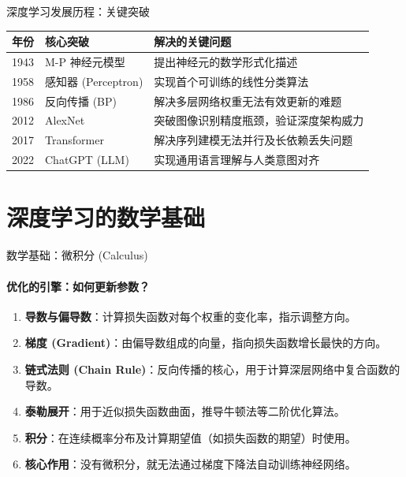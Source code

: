 \documentclass[12pt, t, aspectratio=169]{beamer}
\begin{document}
\begin{frame}{深度学习发展历程：关键突破}
    \centering
    \renewcommand{\arraystretch}{1.5} %
    \begin{tabular}{|c|l|l|}
        \hline
        \textbf{年份} & \textbf{核心突破} & \textbf{解决的关键问题} \\
        \hline
        1943 & M-P 神经元模型 & 提出神经元的数学形式化描述 \\
        \hline
        1958 & 感知器 (Perceptron) & 实现首个可训练的线性分类算法 \\
        \hline
        1986 & 反向传播 (BP) & 解决多层网络权重无法有效更新的难题 \\
        \hline
        2012 & AlexNet & 突破图像识别精度瓶颈，验证深度架构威力 \\
        \hline
        2017 & Transformer & 解决序列建模无法并行及长依赖丢失问题 \\
        \hline
        2022 & ChatGPT (LLM) & 实现通用语言理解与人类意图对齐 \\
        \hline
    \end{tabular}
\end{frame}

\section{深度学习的数学基础}

\begin{frame}{数学基础：微积分 (Calculus)}
    \framesubtitle{优化的引擎：如何更新参数？}
    \begin{enumerate}
        \item \textbf{导数与偏导数}：计算损失函数对每个权重的变化率，指示调整方向。
        \item \textbf{梯度 (Gradient)}：由偏导数组成的向量，指向损失函数增长最快的方向。
        \item \textbf{链式法则 (Chain Rule)}：反向传播的核心，用于计算深层网络中复合函数的导数。
        \item \textbf{泰勒展开}：用于近似损失函数曲面，推导牛顿法等二阶优化算法。
        \item \textbf{积分}：在连续概率分布及计算期望值（如损失函数的期望）时使用。
        \item \textbf{核心作用}：没有微积分，就无法通过梯度下降法自动训练神经网络。
    \end{enumerate}
\end{frame}
\end{document}
